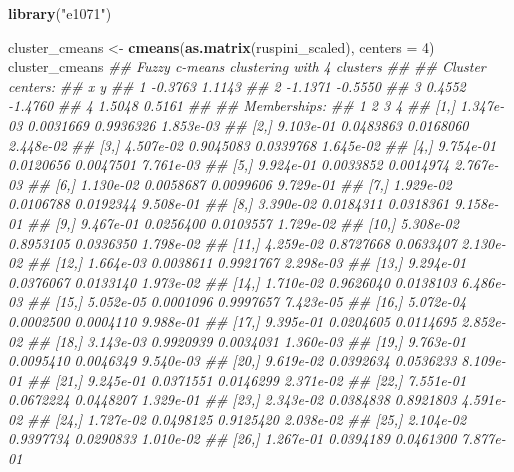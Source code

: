 \documentclass[
  notitlepage]{book}
\newenvironment{Shaded}{\begin{snugshade}}{\end{snugshade}}
\newcommand{\CommentTok}[1]{\textcolor[rgb]{0.56,0.35,0.01}{\textit{#1}}}
\newcommand{\DataTypeTok}[1]{\textcolor[rgb]{0.13,0.29,0.53}{#1}}
\newcommand{\DecValTok}[1]{\textcolor[rgb]{0.00,0.00,0.81}{#1}}
\newcommand{\KeywordTok}[1]{\textcolor[rgb]{0.13,0.29,0.53}{\textbf{#1}}}
\newcommand{\NormalTok}[1]{#1}
\newcommand{\StringTok}[1]{\textcolor[rgb]{0.31,0.60,0.02}{#1}}
\begin{document}
\begin{Shaded}
\begin{Highlighting}[]
\KeywordTok{library}\NormalTok{(}\StringTok{"e1071"}\NormalTok{)}

\NormalTok{cluster\_cmeans \textless{}{-}}\StringTok{ }\KeywordTok{cmeans}\NormalTok{(}\KeywordTok{as.matrix}\NormalTok{(ruspini\_scaled), }\DataTypeTok{centers =} \DecValTok{4}\NormalTok{)}
\NormalTok{cluster\_cmeans}
\CommentTok{\#\# Fuzzy c{-}means clustering with 4 clusters}
\CommentTok{\#\# }
\CommentTok{\#\# Cluster centers:}
\CommentTok{\#\#         x       y}
\CommentTok{\#\# 1 {-}0.3763  1.1143}
\CommentTok{\#\# 2 {-}1.1371 {-}0.5550}
\CommentTok{\#\# 3  0.4552 {-}1.4760}
\CommentTok{\#\# 4  1.5048  0.5161}
\CommentTok{\#\# }
\CommentTok{\#\# Memberships:}
\CommentTok{\#\#               1         2         3         4}
\CommentTok{\#\#  [1,] 1.347e{-}03 0.0031669 0.9936326 1.853e{-}03}
\CommentTok{\#\#  [2,] 9.103e{-}01 0.0483863 0.0168060 2.448e{-}02}
\CommentTok{\#\#  [3,] 4.507e{-}02 0.9045083 0.0339768 1.645e{-}02}
\CommentTok{\#\#  [4,] 9.754e{-}01 0.0120656 0.0047501 7.761e{-}03}
\CommentTok{\#\#  [5,] 9.924e{-}01 0.0033852 0.0014974 2.767e{-}03}
\CommentTok{\#\#  [6,] 1.130e{-}02 0.0058687 0.0099606 9.729e{-}01}
\CommentTok{\#\#  [7,] 1.929e{-}02 0.0106788 0.0192344 9.508e{-}01}
\CommentTok{\#\#  [8,] 3.390e{-}02 0.0184311 0.0318361 9.158e{-}01}
\CommentTok{\#\#  [9,] 9.467e{-}01 0.0256400 0.0103557 1.729e{-}02}
\CommentTok{\#\# [10,] 5.308e{-}02 0.8953105 0.0336350 1.798e{-}02}
\CommentTok{\#\# [11,] 4.259e{-}02 0.8727668 0.0633407 2.130e{-}02}
\CommentTok{\#\# [12,] 1.664e{-}03 0.0038611 0.9921767 2.298e{-}03}
\CommentTok{\#\# [13,] 9.294e{-}01 0.0376067 0.0133140 1.973e{-}02}
\CommentTok{\#\# [14,] 1.710e{-}02 0.9626040 0.0138103 6.486e{-}03}
\CommentTok{\#\# [15,] 5.052e{-}05 0.0001096 0.9997657 7.423e{-}05}
\CommentTok{\#\# [16,] 5.072e{-}04 0.0002500 0.0004110 9.988e{-}01}
\CommentTok{\#\# [17,] 9.395e{-}01 0.0204605 0.0114695 2.852e{-}02}
\CommentTok{\#\# [18,] 3.143e{-}03 0.9920939 0.0034031 1.360e{-}03}
\CommentTok{\#\# [19,] 9.763e{-}01 0.0095410 0.0046349 9.540e{-}03}
\CommentTok{\#\# [20,] 9.619e{-}02 0.0392634 0.0536233 8.109e{-}01}
\CommentTok{\#\# [21,] 9.245e{-}01 0.0371551 0.0146299 2.371e{-}02}
\CommentTok{\#\# [22,] 7.551e{-}01 0.0672224 0.0448207 1.329e{-}01}
\CommentTok{\#\# [23,] 2.343e{-}02 0.0384838 0.8921803 4.591e{-}02}
\CommentTok{\#\# [24,] 1.727e{-}02 0.0498125 0.9125420 2.038e{-}02}
\CommentTok{\#\# [25,] 2.104e{-}02 0.9397734 0.0290833 1.010e{-}02}
\CommentTok{\#\# [26,] 1.267e{-}01 0.0394189 0.0461300 7.877e{-}01}

\end{Highlighting}
\end{Shaded}
\end{document}
